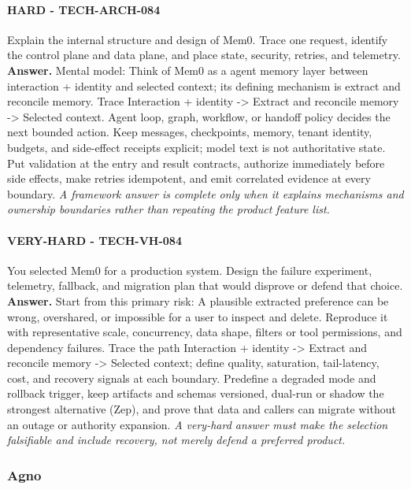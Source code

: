 \paragraph{HARD - TECH-ARCH-084} Explain the internal structure and design of Mem0. Trace one request, identify the control plane and data plane, and place state, security, retries, and telemetry.
\textbf{Answer.} Mental model: Think of Mem0 as a agent memory layer between interaction + identity and selected context; its defining mechanism is extract and reconcile memory. Trace Interaction + identity -> Extract and reconcile memory -> Selected context. Agent loop, graph, workflow, or handoff policy decides the next bounded action. Keep messages, checkpoints, memory, tenant identity, budgets, and side-effect receipts explicit; model text is not authoritative state. Put validation at the entry and result contracts, authorize immediately before side effects, make retries idempotent, and emit correlated evidence at every boundary.
\textit{A framework answer is complete only when it explains mechanisms and ownership boundaries rather than repeating the product feature list.}
\paragraph{VERY-HARD - TECH-VH-084} You selected Mem0 for a production system. Design the failure experiment, telemetry, fallback, and migration plan that would disprove or defend that choice.
\textbf{Answer.} Start from this primary risk: A plausible extracted preference can be wrong, overshared, or impossible for a user to inspect and delete. Reproduce it with representative scale, concurrency, data shape, filters or tool permissions, and dependency failures. Trace the path Interaction + identity -> Extract and reconcile memory -> Selected context; define quality, saturation, tail-latency, cost, and recovery signals at each boundary. Predefine a degraded mode and rollback trigger, keep artifacts and schemas versioned, dual-run or shadow the strongest alternative (Zep), and prove that data and callers can migrate without an outage or authority expansion.
\textit{A very-hard answer must make the selection falsifiable and include recovery, not merely defend a preferred product.}
\subsubsection*{Agno}
